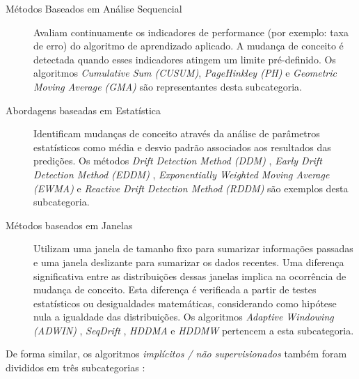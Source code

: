 \documentclass[msc, classic, a4paper]{ufbathesis}
\begin{document}
\begin{description}
    \item[Métodos Baseados em Análise Sequencial] Avaliam continuamente os indicadores de performance (por exemplo: taxa de erro) do algoritmo de aprendizado aplicado.
    A mudança de conceito é detectada quando esses indicadores atingem um limite pré-definido.
    Os algoritmos \textit{Cumulative Sum (CUSUM)}, \textit{PageHinkley (PH)} \cite{Page:CUSUM:PageHinkley:1954} e \textit{Geometric Moving Average (GMA)} \cite{Roberts:2000:CCT:338441.338464}
    são representantes desta subcategoria.

    \item[Abordagens baseadas em Estatística] Identificam mudanças de conceito através da análise de parâmetros estatísticos como média e desvio padrão associados aos resultados das predições.
    Os métodos \textit{Drift Detection Method (DDM)} \cite{GamaMCR04},
    \textit{Early Drift Detection Method (EDDM)} \cite{EDDM},
    \textit{Exponentially Weighted Moving Average (EWMA)} \cite{Ross:2012:EWM:2076039.2076307} e
    \textit{Reactive Drift Detection Method (RDDM)} \cite{Barros:RDDM:2017} são exemplos desta subcategoria.

    \item[Métodos baseados em Janelas] Utilizam uma janela de tamanho fixo para sumarizar informações passadas e uma janela deslizante para sumarizar os dados recentes.
    Uma diferença significativa entre as distribuições dessas janelas implica na ocorrência de mudança de conceito.
    Esta diferença é verificada a partir de testes estatísticos ou desigualdades matemáticas, considerando como hipótese nula a igualdade das distribuições.
    Os algoritmos
    \textit{Adaptive Windowing (ADWIN)} \cite{BifetG07},
    \textit{SeqDrift} \cite{PearsSK14:SeqDrift:2014},
    \textit{HDDMA} e \textit{HDDMW} \cite{BlancoCRBDM15:HDDMA:HDDMW:2015}
    pertencem a esta subcategoria.
\end{description}

De forma similar, os algoritmos \textit{implícitos / não supervisionados} também foram divididos em três subcategorias \cite{GONCALVES20148144}:
\end{document}
